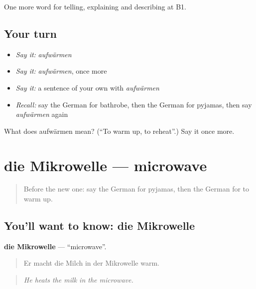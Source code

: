 \begin{grammarlens}[title={What you've built}]
One more word for telling, explaining and describing at B1.
\end{grammarlens}

\subsection*{Your turn}
\begin{itemize}
\raggedright
  \item \emph{Say it:} \emph{aufwärmen}
  \item \emph{Say it:} \emph{aufwärmen}, once more
  \item \emph{Say it:} a sentence of your own with \emph{aufwärmen}
  \item \emph{Recall:} say the German for bathrobe, then the German for pyjamas, then say \emph{aufwärmen} again
\end{itemize}

\begin{tcolorbox}[breakable,colback=teal!4,colframe=teal!35!black,title={Before you move on}]
What does aufwärmen mean? (\textquotedblleft{}To warm up, to reheat\textquotedblright{}.) Say it once more.
\end{tcolorbox}
\section[die Mikrowelle]{die Mikrowelle — microwave}

\label{lesson:GE-C531-mikrowelle}



\begin{quote}
Before the new one: say the German for pyjamas, then the German for to warm up.
\end{quote}

\subsection*{You'll want to know: die Mikrowelle}
\textbf{die Mikrowelle} — \textquotedblleft{}microwave\textquotedblright{}.

\begin{quote}
Er macht die Milch in der Mikrowelle warm.
\end{quote}

\begin{quote}
\emph{He heats the milk in the microwave.}
\end{quote}

